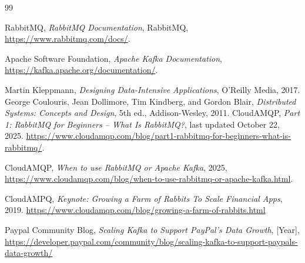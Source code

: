 \documentclass{scrartcl}
\begin{document}

\begin{thebibliography}{99}


RabbitMQ,
\textit{RabbitMQ Documentation},
RabbitMQ, 
\url{https://www.rabbitmq.com/docs/}.


Apache Software Foundation,
\textit{Apache Kafka Documentation},
\url{https://kafka.apache.org/documentation/}.

Martin Kleppmann,
\textit{Designing Data-Intensive Applications},
O'Reilly Media, 2017.
George Coulouris, Jean Dollimore, Tim Kindberg, and Gordon Blair,
\textit{Distributed Systems: Concepts and Design},
5th ed., Addison-Wesley, 2011.
CloudAMQP,
\textit{Part 1: RabbitMQ for Beginners -- What Is RabbitMQ?},
last updated October 22, 2025.
\url{https://www.cloudamqp.com/blog/part1-rabbitmq-for-beginners-what-is-rabbitmq/}.

CloudAMQP,
\textit{When to use RabbitMQ or Apache Kafka},
2025,
\url{https://www.cloudamqp.com/blog/when-to-use-rabbitmq-or-apache-kafka.html}.




CloudAMPQ,
\textit{Keynote: Growing a Farm of Rabbits To Scale Financial Apps}, 2019.
\url{https://www.cloudamqp.com/blog/growing-a-farm-of-rabbits.html}

Paypal Community Blog,
\textit{Scaling Kafka to Support PayPal’s Data Growth},
[Year],
\url{https://developer.paypal.com/community/blog/scaling-kafka-to-support-paypals-data-growth/}


\end{thebibliography}
\end{document}
